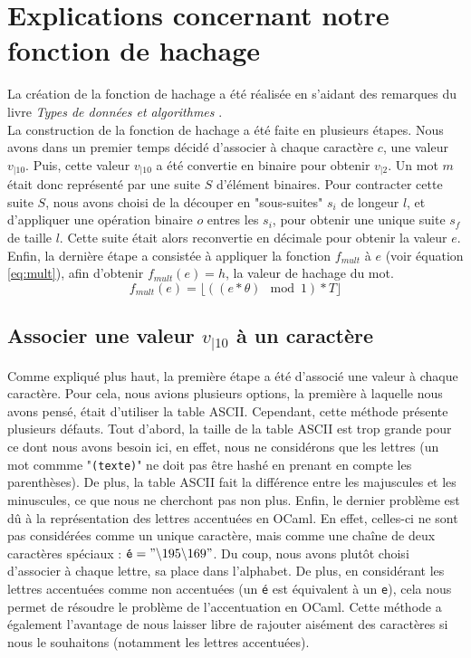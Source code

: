 \documentclass[final,twoside,article,10pt]{scrartcl}
\begin{document}
\section{Explications concernant notre fonction de hachage}
    La création de la fonction de hachage a été réalisée en s'aidant des remarques du livre \emph{Types de données et algorithmes} \cite{soria}.\\
    La construction de la fonction de hachage a été faite en plusieurs étapes. Nous avons dans un premier temps décidé d'associer à chaque caractère $c$, une valeur $v_{|10}$. Puis, cette valeur $v_{|10}$ a été convertie en binaire pour obtenir $v_{|2}$. Un mot $m$ était donc représenté par une suite $S$ d'élément binaires. Pour contracter cette suite $S$, nous avons choisi de la découper en "sous-suites" $s_i$ de longeur $l$, et d'appliquer une opération binaire $o$ entres les $s_i$, pour obtenir une unique suite $s_f$ de taille $l$. Cette suite était alors reconvertie en décimale pour obtenir la valeur $e$. Enfin, la dernière étape a consistée à appliquer la fonction $f_{mult}$ à $e$ (voir équation \ref{eq:mult}), afin d'obtenir $f_{mult}(e) = h$, la valeur de hachage du mot.
    \begin{equation}
        \label{eq:mult}
        f_{mult}(e) = \lfloor ( (e*\theta) \mod 1) * T \rfloor
    \end{equation}
    \subsection{Associer une valeur $v_{|10}$ à un caractère}
    Comme expliqué plus haut, la première étape a été d'associé une valeur à chaque caractère. Pour cela, nous avions plusieurs options, la première à laquelle nous avons pensé, était d'utiliser la table ASCII. Cependant, cette méthode présente plusieurs défauts. Tout d'abord, la taille de la table ASCII est trop grande pour ce dont nous avons besoin ici, en effet, nous ne considérons que les lettres (un mot commme "\texttt{(texte)}" ne doit pas être hashé en prenant en compte les parenthèses). De plus, la table ASCII fait la différence entre les majuscules et les minuscules, ce que nous ne cherchont pas non plus. Enfin, le dernier problème est dû à la représentation des lettres accentuées en OCaml. En effet, celles-ci ne sont pas considérées comme un unique caractère, mais comme une chaîne de deux caractères spéciaux : $\texttt{é} = "\backslash 195\backslash 169"$. 
    Du coup, nous avons plutôt choisi d'associer à chaque lettre, sa place dans l'alphabet. De plus, en considérant les lettres accentuées comme non accentuées (un \texttt{é} est équivalent à un \texttt{e}), cela nous permet de résoudre le problème de l'accentuation en OCaml. Cette méthode a également l'avantage de nous laisser libre de rajouter aisément des caractères si nous le souhaitons (notamment les lettres accentuées).
\end{document}
